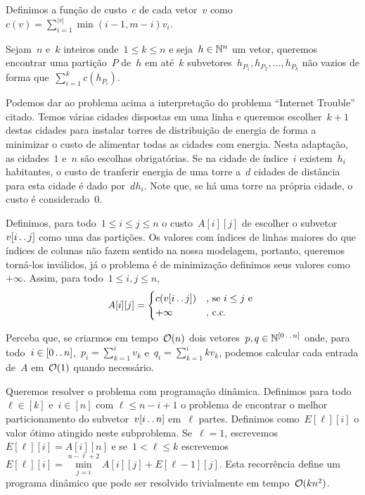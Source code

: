 \begin{prob} \label{DivConq:InternetTrouble}
Definimos a função de custo~$c$ de cada vetor~$v$ como~$c(v) = \sum \limits_{i=1}^{|v|} \min(i-1,m-i)v_i$.  

Sejam~$n$ e~$k$ inteiros onde~$1 \leq k \leq n$ e seja~$h \in \mathbb{N}^n$ um vetor, queremos encontrar uma partição~$P$ de~$h$ em até~$k$ subvetores~$h_{P_1},h_{P_2},\dots,h_{P_k}$ não vazios de forma que~$\sum \limits_{i=1}^k c(h_{P_i})$.
\end{prob}

Podemos dar ao problema acima a interpretação do problema ``Internet Trouble'' citado. Temos várias cidades dispostas em uma linha e queremos escolher~$k + 1$ destas cidades para instalar torres de distribuição de energia de forma a minimizar o custo de alimentar todas as cidades com energia. Nesta adaptação, as cidades~$1$ e~$n$ são escolhas obrigatórias. Se na cidade de índice~$i$ existem~$h_i$ habitantes, o custo de tranferir energia de uma torre a~$d$ cidades de distância para esta cidade é dado por~$dh_i$. Note que, se há uma torre na própria cidade, o custo é considerado~$0$.  

Definimos, para todo~$1 \leq i \leq j \leq n$ o custo~$A[i][j]$ de escolher o subvetor~$v[i \,.\,.\, j]$ como uma das partições. Os valores com índices de linhas maiores do que índices de colunas não fazem sentido na nossa modelagem, portanto, queremos torná-los inválidos, já o problema é de minimização definimos seus valores como~$+\infty$. Assim, para todo~$1 \leq i,j \leq n$,
\begin{equation*}
A[i][j] = \begin{cases}
    c(v[i \,.\,.\, j]) & \text{, se } i \leq j \text{ e }\\
    +\infty          & \text{, c.c.}
\end{cases}
\end{equation*}

Perceba que, se criarmos em tempo~$\mathcal{O}(n)$ dois vetores~$p,q \in \mathbb{N}^{[0 \,.\,.\, n]}$ onde, para todo~$i \in [0 \,.\,.\, n]$,~${p_i = \sum\limits_{k=1}^i v_k}$ e~${q_i = \sum\limits_{k=1}^i kv_k}$, podemos calcular cada entrada de~$A$ em~$\mathcal{O}(1)$ quando necessário.

Queremos resolver o problema com programação dinâmica. Definimos para todo~$\ell \in [k]$ e~$i \in [n]$ com $\ell \leq n - i + 1$ o problema de encontrar o melhor particionamento do subvetor~$v[i \,.\,.\, n]$ em~$\ell$ partes. Definimos como~$E[\ell][i]$ o valor ótimo atingido neste subproblema. Se~$\ell = 1$, escrevemos~$E[\ell][i] = A[i][n]$ e se~$1 < \ell \leq k$ escrevemos~$E[\ell][i] = \min \limits_{j=i}^{n-\ell+2} A[i][j] + E[\ell-1][j]$. Esta recorrência define um programa dinâmico que pode ser resolvido trivialmente em tempo~$\mathcal{O}(kn^2)$.

